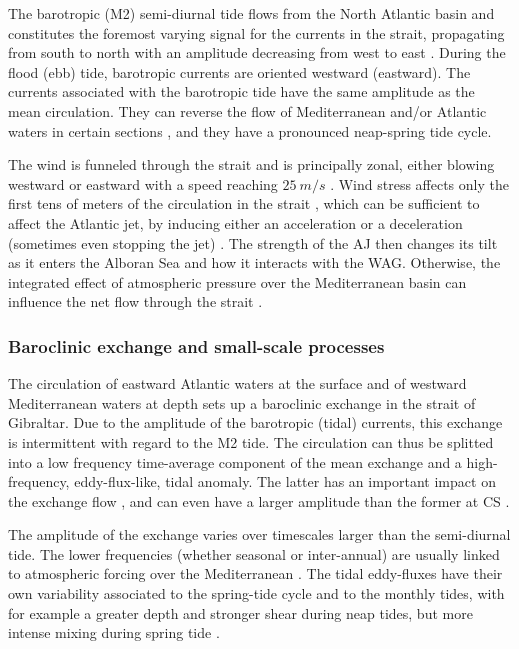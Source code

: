 The barotropic (M2) semi-diurnal tide flows from the North Atlantic basin and constitutes the foremost varying signal for the currents in the strait, propagating from south to north with an amplitude decreasing from west to east \citep{candela_1990}. During the flood (ebb) tide, barotropic currents are oriented westward (eastward). The currents associated with the barotropic tide have the same amplitude as the mean circulation. They can reverse the flow of Mediterranean and/or Atlantic waters in certain sections \citep{sanchez-roman_2012}, and they have a pronounced neap-spring tide cycle.

The wind is funneled through the strait and is principally zonal, either blowing westward or eastward with a speed reaching $25\ m/s$ \citep{candela_1989}. Wind stress affects only the first tens of meters of the circulation in the strait \citep{candela_1989}, which can be sufficient to affect the Atlantic jet, by inducing either an acceleration or a deceleration (sometimes even stopping the jet) \citep{lorente_2019}. The strength of the AJ then changes its tilt as it enters the Alboran Sea and how it interacts with the WAG. Otherwise, the integrated effect of atmospheric pressure over the Mediterranean basin can influence the net flow through the strait \citep{garcialafuente_2002}.



\subsubsection{Baroclinic exchange and small-scale processes}


The circulation of eastward Atlantic waters at the surface and of westward Mediterranean waters at depth sets up a baroclinic exchange in the strait of Gibraltar. Due to the amplitude of the barotropic (tidal) currents, this exchange is intermittent with regard to the M2 tide. The circulation can thus be splitted into a low frequency time-average component of the mean exchange and a high-frequency, eddy-flux-like, tidal anomaly. The latter has an important impact on the exchange flow \citep{naranjo_2014}, and can even have a larger amplitude than the former at CS \citep{vargas_2006}.

The amplitude of the exchange varies over timescales larger than the semi-diurnal tide. The lower frequencies (whether seasonal or inter-annual) are usually linked to atmospheric forcing over the Mediterranean \citep{sanchez-roman_2012}. The tidal eddy-fluxes have their own variability associated to the spring-tide cycle and to the monthly tides, with for example a greater depth and stronger shear during neap tides, but more intense mixing during spring tide \citep{naranjo_2014,vargas_2006}.

